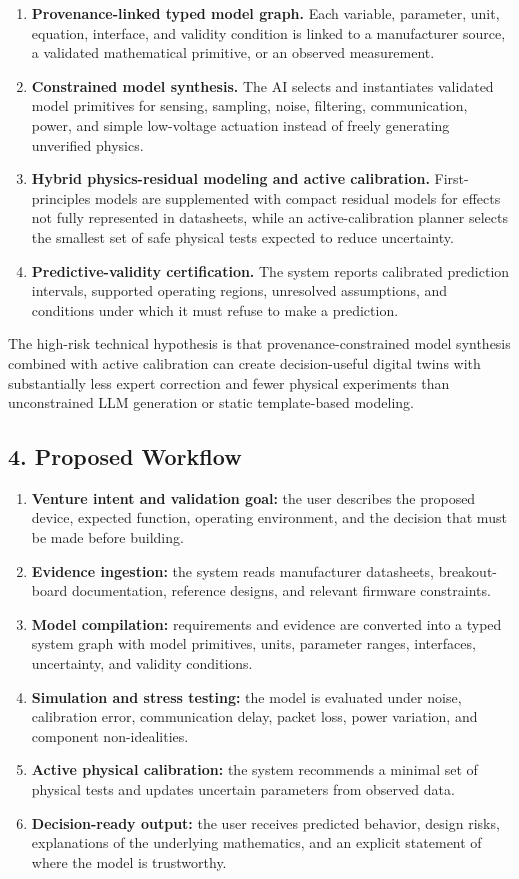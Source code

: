 \documentclass[12pt,letterpaper]{article}
\begin{document}
\begin{enumerate}
    \item \textbf{Provenance-linked typed model graph.} Each variable, parameter, unit, equation, interface, and validity condition is linked to a manufacturer source, a validated mathematical primitive, or an observed measurement.
    \item \textbf{Constrained model synthesis.} The AI selects and instantiates validated model primitives for sensing, sampling, noise, filtering, communication, power, and simple low-voltage actuation instead of freely generating unverified physics.
    \item \textbf{Hybrid physics-residual modeling and active calibration.} First-principles models are supplemented with compact residual models for effects not fully represented in datasheets, while an active-calibration planner selects the smallest set of safe physical tests expected to reduce uncertainty.
    \item \textbf{Predictive-validity certification.} The system reports calibrated prediction intervals, supported operating regions, unresolved assumptions, and conditions under which it must refuse to make a prediction.
\end{enumerate}

The high-risk technical hypothesis is that provenance-constrained model synthesis combined with active calibration can create decision-useful digital twins with substantially less expert correction and fewer physical experiments than unconstrained LLM generation or static template-based modeling.

\subsection*{4. Proposed Workflow}

\begin{enumerate}
    \item \textbf{Venture intent and validation goal:} the user describes the proposed device, expected function, operating environment, and the decision that must be made before building.
    \item \textbf{Evidence ingestion:} the system reads manufacturer datasheets, breakout-board documentation, reference designs, and relevant firmware constraints.
    \item \textbf{Model compilation:} requirements and evidence are converted into a typed system graph with model primitives, units, parameter ranges, interfaces, uncertainty, and validity conditions.
    \item \textbf{Simulation and stress testing:} the model is evaluated under noise, calibration error, communication delay, packet loss, power variation, and component non-idealities.
    \item \textbf{Active physical calibration:} the system recommends a minimal set of physical tests and updates uncertain parameters from observed data.
    \item \textbf{Decision-ready output:} the user receives predicted behavior, design risks, explanations of the underlying mathematics, and an explicit statement of where the model is trustworthy.
\end{enumerate}
\end{document}
